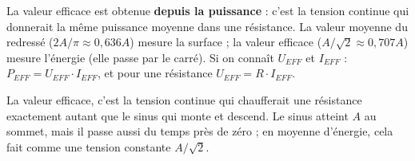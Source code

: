 \begin{propbox}[title=Moyenne vs efficace]
La valeur efficace est obtenue \textbf{depuis la puissance} : c'est la tension continue qui
donnerait la même puissance moyenne dans une résistance. La valeur moyenne du redressé
($2A/\pi\approx 0{,}636A$) mesure la surface ; la valeur efficace ($A/\sqrt2\approx0{,}707A$)
mesure l'énergie (elle passe par le carré). Si on connaît $U_{EFF}$ et $I_{EFF}$ :
$P_{EFF} = U_{EFF}\cdot I_{EFF}$, et pour une résistance $U_{EFF} = R\cdot I_{EFF}$.
\end{propbox}

\begin{goatbox}
La valeur efficace, c'est la tension continue qui chaufferait une résistance exactement
autant que le sinus qui monte et descend. Le sinus atteint $A$ au sommet, mais il passe
aussi du temps près de zéro ; \og en moyenne d'énergie\fg{}, cela fait comme une tension
constante $A/\sqrt2$.
\end{goatbox}

